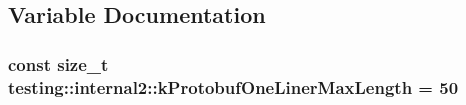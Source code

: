 \subsection{Variable Documentation}
\hypertarget{namespacetesting_1_1internal2_a140c8efd51e63a3def98445bff107518}{
\subsubsection[{k\-Protobuf\-One\-Liner\-Max\-Length}]{\setlength{\rightskip}{0pt plus 5cm}const size\-\_\-t testing\-::internal2\-::k\-Protobuf\-One\-Liner\-Max\-Length = 50}}\label{namespacetesting_1_1internal2_a140c8efd51e63a3def98445bff107518}
